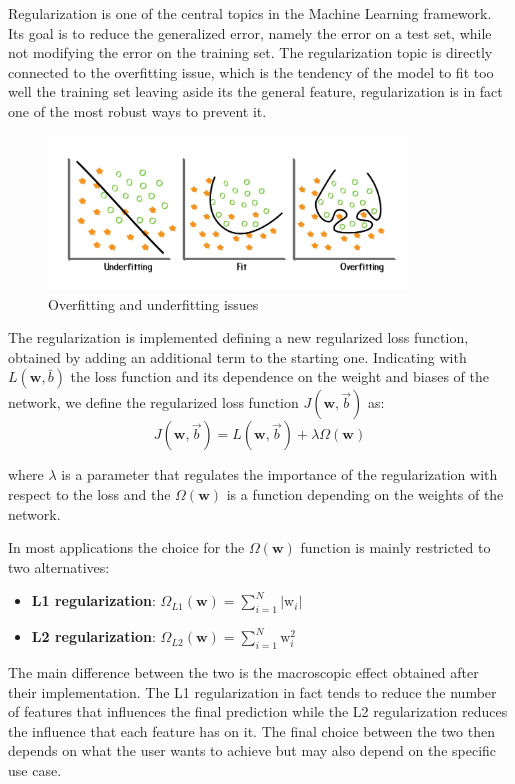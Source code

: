 \documentclass[../../main.tex]{subfiles}
\begin{document}
Regularization is one of the central topics in the Machine Learning framework. Its goal is to reduce the generalized error, namely the error on a test set, while not modifying the error on the training set. The regularization topic is directly connected to the overfitting issue, which is the tendency of the model to fit too well the training set leaving aside its the general feature, regularization is in fact one of the most robust ways to prevent it.

\begin{figure}[h]
    \centering
\includegraphics[width=0.85\textwidth]{sections/03/Images/ML_issues.jpg}
\caption{Overfitting and underfitting issues}
    \label{fig:overfitting}
\end{figure}

The regularization is implemented defining a new regularized loss function, obtained by adding an additional term to the starting one. Indicating with $L(\boldsymbol{w},\bar{b})$ the loss function and its dependence on the weight and biases of the network, we define the regularized loss function $J(\mathbf{w}, \vec{b})$ as:
\begin{equation}
J(\mathbf{w}, \vec{b})=L(\mathbf{w}, \vec{b})+ \lambda\Omega(\mathbf{w})
\end{equation}

where $\lambda$ is a parameter that regulates the importance of the regularization with respect to the loss and the $\Omega(\mathbf{w})$ is a function depending on the weights of the network. 


In most applications the choice for the $\Omega(\mathbf{w})$ function is mainly restricted to two alternatives:
\begin{itemize}
    \item \textbf{L1 regularization}: $\Omega_{L1}(\mathbf{w}) = \sum_{i=1}^N |\text{w}_i|$
    \item \textbf{L2 regularization}: $\Omega_{L2}(\mathbf{w}) = \sum_{i=1}^N \text{w}_i^2$
\end{itemize}

The main difference between the two is the macroscopic effect obtained after their implementation. The L1 regularization in fact tends to reduce the number of features that influences the final prediction while the L2 regularization reduces the influence that each feature has on it. The final choice between the two then depends on what the user wants to achieve but may also depend on the specific use case.
    
\end{document}
